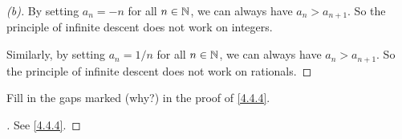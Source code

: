 \begin{proof}[(b)]
  By setting \(a_n = -n\) for all \(n \in \mathbb{N}\), we can always have \(a_n > a_{n + 1}\).
  So the principle of infinite descent does not work on integers.

  Similarly, by setting \(a_n = 1 / n\) for all \(n \in \mathbb{N}\), we can always have \(a_n > a_{n + 1}\).
  So the principle of infinite descent does not work on rationals.
\end{proof}

\begin{ex}\label{ex:4.4.3}
  Fill in the gaps marked (why?) in the proof of \cref{4.4.4}.
\end{ex}

\begin{proof}[]
  See \cref{4.4.4}.
\end{proof}

